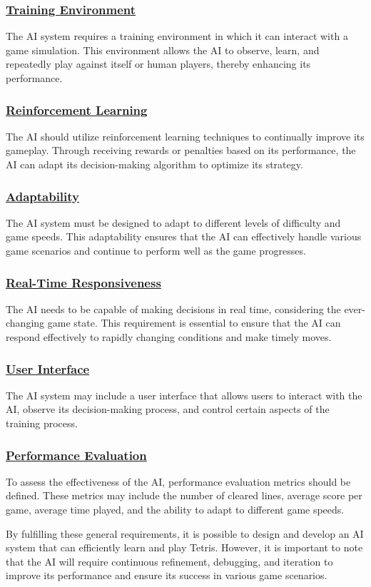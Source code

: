 \documentclass[conference]{IEEEtran}
\begin{document}
\subsubsection{\underline{Training Environment}}
The AI system requires a training environment in which it can interact with a game simulation. This environment allows the AI to observe, learn, and repeatedly play against itself or human players, thereby enhancing its performance.
\subsubsection{\underline{Reinforcement Learning}}
The AI should utilize reinforcement learning techniques to continually improve its gameplay. Through receiving rewards or penalties based on its performance, the AI can adapt its decision-making algorithm to optimize its strategy.
\subsubsection{\underline{Adaptability}}
The AI system must be designed to adapt to different levels of difficulty and game speeds. This adaptability ensures that the AI can effectively handle various game scenarios and continue to perform well as the game progresses.
\subsubsection{\underline{Real-Time Responsiveness}}
The AI needs to be capable of making decisions in real time, considering the ever-changing game state. This requirement is essential to ensure that the AI can respond effectively to rapidly changing conditions and make timely moves.
\subsubsection{\underline{User Interface}}
The AI system may include a user interface that allows users to interact with the AI, observe its decision-making process, and control certain aspects of the training process.
\subsubsection{\underline{Performance Evaluation}}
To assess the effectiveness of the AI, performance evaluation metrics should be defined. These metrics may include the number of cleared lines, average score per game, average time played, and the ability to adapt to different game speeds.\newline

By fulfilling these general requirements, it is possible to design and develop an AI system that can efficiently learn and play Tetris. However, it is important to note that the AI will require continuous refinement, debugging, and iteration to improve its performance and ensure its success in various game scenarios.
\end{document}
